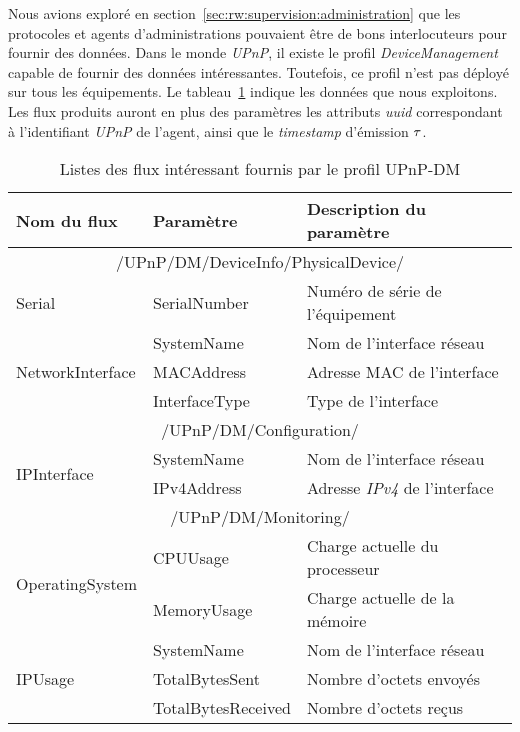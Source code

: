 Nous avions exploré en section~\ref{sec:rw:supervision:administration} que les protocoles et agents d'administrations pouvaient être de bons interlocuteurs pour fournir des données. Dans le monde \textit{UPnP}, il existe le profil \textit{DeviceManagement} capable de fournir des données intéressantes. Toutefois, ce profil n'est pas déployé sur tous les équipements. Le tableau~\ref{tab:valid:domvision:upnpdm} indique les données que nous exploitons. Les flux produits auront en plus des paramètres les attributs \textit{uuid} correspondant à l'identifiant \textit{UPnP} de l'agent, ainsi que le \textit{timestamp} d'émission $\tau$.

\begin{table}
\centering
\begin{tabular}{|m{}|>{\ttfamily}m{}|m{}|} \bottomrule
\rowcolor{hypcolor} Nom du flux & \rm Paramètre & Description du paramètre\\ \hline
\multicolumn{3}{|c|}{/UPnP/DM/DeviceInfo/PhysicalDevice/} \\\hline
Serial & {SerialNumber} & Numéro de série de l'équipement\\\hline
\multirow{3}{*}{NetworkInterface} & {SystemName} & Nom de l'interface réseau\\\cline{2-3}
& {MACAddress} & Adresse MAC de l'interface\\\cline{2-3}
& InterfaceType & Type de l'interface \\\hline
\multicolumn{3}{|c|}{/UPnP/DM/Configuration/} \\\hline
\multirow{2}{*}{IPInterface} & SystemName & Nom de l'interface réseau \\\cline{2-3}
& IPv4Address & Adresse \textit{IPv4} de l'interface \\ \hline
\multicolumn{3}{|c|}{/UPnP/DM/Monitoring/} \\\hline
\multirow{2}{*}{OperatingSystem} & CPUUsage & Charge actuelle du processeur\\\cline{2-3}
& MemoryUsage & Charge actuelle de la mémoire\\ \hline
\multirow{3}{*}{IPUsage} & SystemName & Nom de l'interface réseau\\ \cline{2-3}
& TotalBytesSent & Nombre d'octets envoyés \\\cline{2-3}
& TotalBytesReceived & Nombre d'octets reçus \\ \toprule
\end{tabular}
\caption{Listes des flux intéressant fournis par le profil UPnP-DM}\label{tab:valid:domvision:upnpdm}
\end{table}

